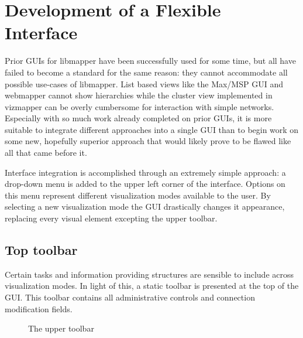 \section{Development of a Flexible Interface}
	
Prior GUIs for libmapper have been successfully used for some time, but all have failed to become a standard for the same reason: they cannot accommodate all possible use-cases of libmapper. List based views like the Max/MSP GUI and webmapper cannot show hierarchies while the cluster view implemented in vizmapper can be overly cumbersome for interaction with simple networks. Especially with so much work already completed on prior GUIs, it is more suitable to integrate different approaches into a single GUI than to begin work on some new, hopefully superior approach that would likely prove to be flawed like all that came before it. 

Interface integration is accomplished through an extremely simple approach: a drop-down menu is added to the upper left corner of the interface. Options on this menu represent different visualization modes available to the user. By selecting a new visualization mode the GUI drastically changes it appearance, replacing every visual element excepting the upper toolbar.

\subsection{Top toolbar}

Certain tasks and information providing structures are sensible to include across visualization modes. In light of this, a static toolbar is presented at the top of the GUI. This toolbar contains all administrative controls and connection modification fields. 

\begin{figure}[ht]
\centering
\caption{The upper toolbar}
\label{fig:toolbar}
\end{figure}


